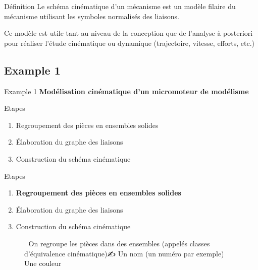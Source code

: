 \documentclass[
  ignorenonframetext,
  aspectratio=169,
  c]{beamer}
\providecommand{\tightlist}{%
  \setlength{\itemsep}{0pt}\setlength{\parskip}{0pt}}\usepackage{longtable,booktabs,array}
\begin{document}
\begin{frame}{Définition}
Le schéma cinématique d'un mécanisme est un modèle filaire du mécanisme
utilisant les symboles normalisés des liaisons.

Ce modèle est utile tant au niveau de la conception que de l'analyse à
posteriori pour réaliser l'étude cinématique ou dynamique (trajectoire,
vitesse, efforts, etc.)
\end{frame}

\subsection{Example 1}\label{example-1}

\begin{frame}{Example 1}
\textbf{Modélisation cinématique d'un micromoteur de modélisme}
\end{frame}

\begin{frame}{Etapes}
\label{etapes}
\begin{enumerate}
\tightlist
\item
  Regroupement des pièces en ensembles solides
\item
  Élaboration du graphe des liaisons
\item
  Construction du schéma cinématique
\end{enumerate}
\end{frame}

\begin{frame}{Etapes}
\label{etapes-1}
\begin{enumerate}
\tightlist
\item
  \textbf{Regroupement des pièces en ensembles solides}
\item
  {Élaboration du graphe des liaisons}
\item
  {Construction du schéma cinématique}
\end{enumerate}

\begin{figure}

\begin{minipage}{0.70\linewidth}
🔎 On regroupe les pièces dans des ensembles (appelés classes
d'équivalence cinématique)✍️ Un nom (un numéro par exemple)🔵 Une
couleur\end{minipage}%

\end{figure}%
\end{frame}
\end{document}
